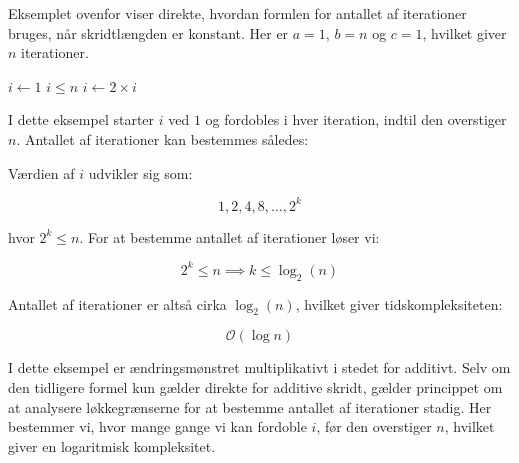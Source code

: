 Eksemplet ovenfor viser direkte, hvordan formlen for antallet af iterationer bruges, når skridtlængden er konstant. Her er $a = 1$, $b = n$ og $c = 1$, hvilket giver $n$ iterationer.

\begin{example}

    \begin{codebox}
        \li $i \gets 1$
        \li \While $i \leq n$ \Do
        \li     {}
        \li     $i \gets 2 \times i$
            \End
    \end{codebox}
    
    I dette eksempel starter $i$ ved $1$ og fordobles i hver iteration, indtil den overstiger $n$. Antallet af iterationer kan bestemmes således:
    
    Værdien af $i$ udvikler sig som:
    
    \[
    1, 2, 4, 8, \dots, 2^k
    \]
    
    hvor $2^k \leq n$. For at bestemme antallet af iterationer løser vi:
    
    \[
    2^k \leq n \implies k \leq \log_2(n)
    \]
    
    Antallet af iterationer er altså cirka $\log_2(n)$, hvilket giver tidskompleksiteten:
    
    \[
    \mathcal{O}(\log n)
    \]
    
    I dette eksempel er ændringsmønstret multiplikativt i stedet for additivt. Selv om den tidligere formel kun gælder direkte for additive skridt, gælder princippet om at analysere løkkegrænserne for at bestemme antallet af iterationer stadig. Her bestemmer vi, hvor mange gange vi kan fordoble $i$, før den overstiger $n$, hvilket giver en logaritmisk kompleksitet.

\end{example}

